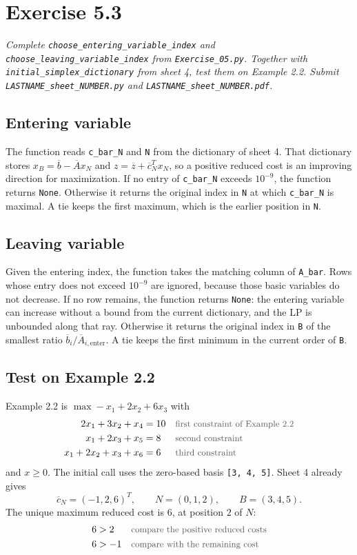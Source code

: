 \documentclass[a4paper,11pt]{article}
\newif\ifexplain
\newcommand{\aufgabe}[1]{\section*{Exercise #1}}
\newcommand{\angabe}[1]{\textit{#1}\par\smallskip}
\newcommand{\teil}[1]{\subsection*{#1}}
\newcommand{\why}[1]{\text{\small\color{black!65}#1}}
\newcommand{\explain}[1]{\ifexplain\begin{erklbox}#1\end{erklbox}\fi}
\begin{document}
\aufgabe{5.3}
\angabe{Complete \texttt{choose\_entering\_variable\_index} and \texttt{choose\_leaving\_variable\_index} from \texttt{Exercise\_05.py}. Together with \texttt{initial\_simplex\_dictionary} from sheet 4, test them on Example 2.2. Submit \texttt{LASTNAME\_sheet\_NUMBER.py} and \texttt{LASTNAME\_sheet\_NUMBER.pdf}.}
\teil{Entering variable}
The function reads \texttt{c\_bar\_N} and \texttt{N} from the dictionary of sheet 4. That dictionary stores $x_B=\overline b-\overline A x_N$ and $z=\overline z+\overline c_N^T x_N$, so a positive reduced cost is an improving direction for maximization. If no entry of \texttt{c\_bar\_N} exceeds $10^{-9}$, the function returns \texttt{None}. Otherwise it returns the original index in \texttt{N} at which \texttt{c\_bar\_N} is maximal. A tie keeps the first maximum, which is the earlier position in \texttt{N}.
\teil{Leaving variable}
Given the entering index, the function takes the matching column of \texttt{A\_bar}. Rows whose entry does not exceed $10^{-9}$ are ignored, because those basic variables do not decrease. If no row remains, the function returns \texttt{None}: the entering variable can increase without a bound from the current dictionary, and the LP is unbounded along that ray. Otherwise it returns the original index in \texttt{B} of the smallest ratio $\overline b_i/\overline A_{i,\mathrm{enter}}$. A tie keeps the first minimum in the current order of \texttt{B}.
\explain{Die Toleranz steht schon im Skelett. Sie verhindert, dass Rundungsrauschen eine fast null als Eintritts- oder Austrittskandidat zählt. Bei Gleichstand folgt der Code der Reihenfolge im Dictionary, nicht einer zusätzlichen Bland-Regel über alle Variablenindizes. Für Example 2.2 gibt es keinen Gleichstand.}
\teil{Test on Example 2.2}
Example 2.2 is $\max -x_1+2x_2+6x_3$ with
\begin{align*}
2x_1+3x_2+x_4&=10&&\why{first constraint of Example 2.2}\\
x_1+2x_3+x_5&=8&&\why{second constraint}\\
x_1+2x_2+x_3+x_6&=6&&\why{third constraint}
\end{align*}
and $x\geq 0$. The initial call uses the zero-based basis \texttt{[3, 4, 5]}. Sheet 4 already gives
\[\overline c_N=(-1,2,6)^T,\qquad N=(0,1,2),\qquad B=(3,4,5).\]
The unique maximum reduced cost is $6$, at position $2$ of $N$:
\begin{align*}
6&>2&&\why{compare the positive reduced costs}\\
6&>-1&&\why{compare with the remaining cost}
\end{align*}
\end{document}
